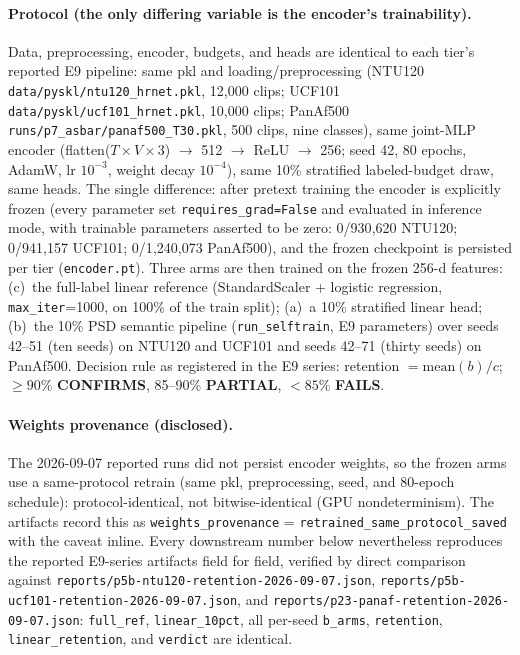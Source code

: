 \documentclass[11pt,a4paper]{article}
\begin{document}
\paragraph{Protocol (the only differing variable is the encoder's trainability).}
Data, preprocessing, encoder, budgets, and heads are identical to each tier's reported E9 pipeline: same pkl and loading/preprocessing (NTU120 \texttt{data/pyskl/ntu120\_hrnet.pkl}, 12{,}000 clips; UCF101 \texttt{data/pyskl/ucf101\_hrnet.pkl}, 10{,}000 clips; PanAf500 \texttt{runs/p7\_asbar/panaf500\_T30.pkl}, 500 clips, nine classes), same joint-MLP encoder (flatten($T{\times}V{\times}3$) $\to$ 512 $\to$ ReLU $\to$ 256; seed 42, 80 epochs, AdamW, lr $10^{-3}$, weight decay $10^{-4}$), same 10\% stratified labeled-budget draw, same heads. The single difference: after pretext training the encoder is explicitly frozen (every parameter set \texttt{requires\_grad=False} and evaluated in inference mode, with trainable parameters asserted to be zero: 0/930{,}620 NTU120; 0/941{,}157 UCF101; 0/1{,}240{,}073 PanAf500), and the frozen checkpoint is persisted per tier (\texttt{encoder.pt}). Three arms are then trained on the frozen 256-d features: (c)~the full-label linear reference (StandardScaler + logistic regression, \texttt{max\_iter}=1000, on 100\% of the train split); (a)~a 10\% stratified linear head; (b)~the 10\% PSD semantic pipeline (\texttt{run\_selftrain}, E9 parameters) over seeds 42--51 (ten seeds) on NTU120 and UCF101 and seeds 42--71 (thirty seeds) on PanAf500. Decision rule as registered in the E9 series: retention $= \mathrm{mean}(b)/c$; $\geq 90\%$ \textbf{CONFIRMS}, 85--90\% \textbf{PARTIAL}, $< 85\%$ \textbf{FAILS}.

\paragraph{Weights provenance (disclosed).}
The 2026-09-07 reported runs did not persist encoder weights, so the frozen arms use a same-protocol retrain (same pkl, preprocessing, seed, and 80-epoch schedule): protocol-identical, not bitwise-identical (GPU nondeterminism). The artifacts record this as \texttt{weights\_provenance} = \texttt{retrained\_same\_protocol\_saved} with the caveat inline. Every downstream number below nevertheless reproduces the reported E9-series artifacts field for field, verified by direct comparison against \texttt{reports/p5b-ntu120-retention-2026-09-07.json}, \texttt{reports/p5b-ucf101-retention-2026-09-07.json}, and \texttt{reports/p23-panaf-retention-2026-09-07.json}: \texttt{full\_ref}, \texttt{linear\_10pct}, all per-seed \texttt{b\_arms}, \texttt{retention}, \texttt{linear\_retention}, and \texttt{verdict} are identical.
\end{document}
